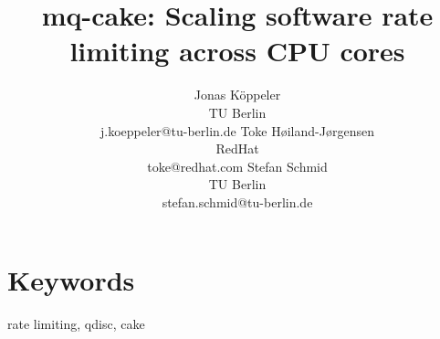 \documentclass[letterpaper]{article}
\title{mq-cake: Scaling software rate limiting across CPU cores}
\author{Jonas Köppeler\\TU Berlin \\j.koeppeler@tu-berlin.de \And Toke H\o{}iland-J\o{}rgensen\\RedHat\\toke@redhat.com \And Stefan Schmid \\ TU Berlin\\stefan.schmid@tu-berlin.de
}
\begin{document}
\maketitle

\section{Keywords}
rate limiting, qdisc, cake








\balance

\end{document}
